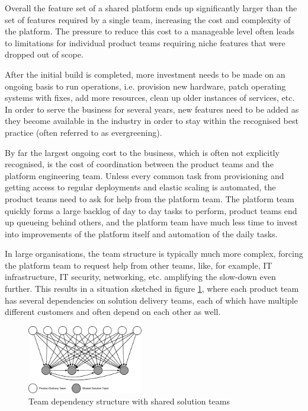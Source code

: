 \documentclass[reprint,amsmath,amssymb,aps]{revtex4-1}
\begin{document}
Overall the feature set of a shared platform ends up significantly larger than the set of features required by a single team, increasing the cost and complexity of the platform. The pressure to reduce this cost to a manageable level often leads to limitations for individual product teams requiring niche features that were dropped out of scope.

After the initial build is completed, more investment needs to be made on an ongoing basis to run operations, i.e. provision new hardware, patch operating systems with fixes, add more resources, clean up older instances of services, etc. In order to serve the business for several years, new features need to be added as they become available in the industry in order to stay within the recognised best practice (often referred to as evergreening).

By far the largest ongoing cost to the business, which is often not explicitly recognised, is the cost of coordination between the product teams and the platform engineering team. Unless every common task from provisioning and getting access to regular deployments and elastic scaling is automated, the product teams need to ask for help from the platform team. The platform team quickly forms a large backlog of day to day tasks to perform, product teams end up queueing behind others, and the platform team have much less time to invest into improvements of the platform itself and automation of the daily tasks. 

In large organisations, the team structure is typically much more complex, forcing the platform team to request help from other teams, like, for example, IT infrastructure, IT security, networking, etc. amplifying the slow-down even further. This results in a situation sketched in figure \ref{fig:dependencies}, where each product team has several dependencies on solution delivery teams, each of which have multiple different customers and often depend on each other as well.  


\begin{figure}[h]
        \includegraphics[width=0.45\textwidth]{figs/dependencies}
        \caption{Team dependency structure with shared solution teams}
        \label{fig:dependencies}
\end{figure}
\end{document}
